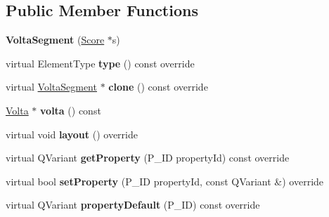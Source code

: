 \subsection*{Public Member Functions}
\begin{DoxyCompactItemize}
\item 
\mbox{\label{class_ms_1_1_volta_segment_a5407217068fe091685362a704d4b19e6}} 
{\bfseries Volta\+Segment} (\hyperlink{class_ms_1_1_score}{Score} $\ast$s)
\item 
\mbox{\label{class_ms_1_1_volta_segment_a9827e58a1608099027bafd729f9b5e93}} 
virtual Element\+Type {\bfseries type} () const override
\item 
\mbox{\label{class_ms_1_1_volta_segment_a1d47e80dd5e1b5d3c34bba8caaa6e950}} 
virtual \hyperlink{class_ms_1_1_volta_segment}{Volta\+Segment} $\ast$ {\bfseries clone} () const override
\item 
\mbox{\label{class_ms_1_1_volta_segment_a620b976986d3b366a74fd810704b6b23}} 
\hyperlink{class_ms_1_1_volta}{Volta} $\ast$ {\bfseries volta} () const
\item 
\mbox{\label{class_ms_1_1_volta_segment_aa93d4b2916cfa1cacb51cc571461c399}} 
virtual void {\bfseries layout} () override
\item 
\mbox{\label{class_ms_1_1_volta_segment_a40e75e84272b4bfd60967f5d47817d05}} 
virtual Q\+Variant {\bfseries get\+Property} (P\+\_\+\+ID property\+Id) const override
\item 
\mbox{\label{class_ms_1_1_volta_segment_a5475406f7ae809f95cd1b08a045747b0}} 
virtual bool {\bfseries set\+Property} (P\+\_\+\+ID property\+Id, const Q\+Variant \&) override
\item 
\mbox{\label{class_ms_1_1_volta_segment_a651c722c4719d68b53c63c566daa7938}} 
virtual Q\+Variant {\bfseries property\+Default} (P\+\_\+\+ID) const override
\item 
\mbox{\label{class_ms_1_1_volta_segment_a1a5a08bae08cc5e63ac2ebeabdc938ce}} 

\end{DoxyCompactItemize}
